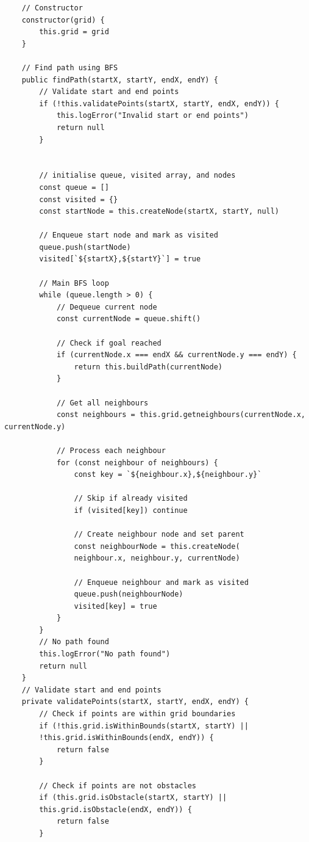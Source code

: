 \begin{verbatim}
    // Constructor
    constructor(grid) {
        this.grid = grid
    }
    
    // Find path using BFS
    public findPath(startX, startY, endX, endY) {
        // Validate start and end points
        if (!this.validatePoints(startX, startY, endX, endY)) {
            this.logError("Invalid start or end points")
            return null
        }

        
        // initialise queue, visited array, and nodes
        const queue = []
        const visited = {}
        const startNode = this.createNode(startX, startY, null)
        
        // Enqueue start node and mark as visited
        queue.push(startNode)
        visited[`${startX},${startY}`] = true
        
        // Main BFS loop
        while (queue.length > 0) {
            // Dequeue current node
            const currentNode = queue.shift()
            
            // Check if goal reached
            if (currentNode.x === endX && currentNode.y === endY) {
                return this.buildPath(currentNode)
            }
            
            // Get all neighbours
            const neighbours = this.grid.getneighbours(currentNode.x, currentNode.y)
            
            // Process each neighbour
            for (const neighbour of neighbours) {
                const key = `${neighbour.x},${neighbour.y}`
                
                // Skip if already visited
                if (visited[key]) continue
                
                // Create neighbour node and set parent
                const neighbourNode = this.createNode(
                neighbour.x, neighbour.y, currentNode)
                
                // Enqueue neighbour and mark as visited
                queue.push(neighbourNode)
                visited[key] = true
            }
        }
        // No path found
        this.logError("No path found")
        return null
    }
    // Validate start and end points
    private validatePoints(startX, startY, endX, endY) {
        // Check if points are within grid boundaries
        if (!this.grid.isWithinBounds(startX, startY) ||
        !this.grid.isWithinBounds(endX, endY)) {
            return false
        }
        
        // Check if points are not obstacles
        if (this.grid.isObstacle(startX, startY) || 
        this.grid.isObstacle(endX, endY)) {
            return false
        }
        

\end{verbatim}
